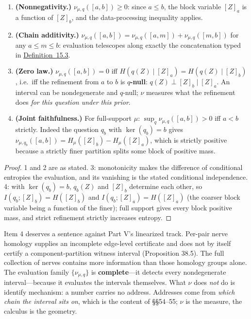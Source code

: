 \begin{thmplain}

\par\nopagebreak

\begin{enumerate}
\def\labelenumi{\arabic{enumi}.}
\tightlist
\item
  \textbf{(Nonnegativity.)} \(\nu_{\mu,q}([a,b]) \ge 0\): since \(a \le b\), the block variable \([Z]_a\) is a function of \([Z]_b\), and the data-processing inequality applies.
\item
  \textbf{(Chain additivity.)} \(\nu_{\mu,q}([a,b]) = \nu_{\mu,q}([a,m]) + \nu_{\mu,q}([m,b])\) for any \(a \le m \le b\): evaluation telescopes along exactly the concatenation typed in \hyperlink{stmt:15.3}{Definition~15.3}.
\item
  \textbf{(Zero law.)} \(\nu_{\mu,q}([a,b]) = 0\) iff \(H(q(Z) \mid [Z]_a) = H(q(Z) \mid [Z]_b)\), i.e.~iff the refinement from \(a\) to \(b\) is \textbf{\(q\)-null}: \(q(Z) \perp [Z]_b \mid [Z]_a\). An interval can be nondegenerate and \(q\)-null; \(\nu\) measures what the refinement does \emph{for this question under this prior}.
\item
  \textbf{(Joint faithfulness.)} For full-support \(\mu\): \(\sup_q \nu_{\mu,q}([a,b]) > 0\) iff \(a < b\) strictly. Indeed the question \(q_b\) with \(\ker(q_b) = b\) gives \(\nu_{\mu,q_b}([a,b]) = H_\mu([Z]_b) - H_\mu([Z]_a)\), which is strictly positive because a strictly finer partition splits some block of positive mass.
\end{enumerate}
\end{thmplain}

\begin{proof}

1 and 2 are as stated. 3: monotonicity makes the difference of conditional entropies the evaluation, and its vanishing is the stated conditional independence. 4: with \(\ker(q_b) = b\), \(q_b(Z)\) and \([Z]_b\) determine each other, so \(I(q_b; [Z]_b) = H([Z]_b)\) and \(I(q_b; [Z]_a) = H([Z]_a)\) (the coarser block variable being a function of the finer); full support gives every block positive mass, and strict refinement strictly increases entropy.
\end{proof}

Item 4 deserves a sentence against Part V's linearized track. Per-pair nerve homology supplies an incomplete edge-level certificate and does not by itself certify a component-partition witness interval (Proposition 38.5). The full collection of nerves contains more information than those homology groups alone. The evaluation family \(\{\nu_{\mu,q}\}\) is \textbf{complete}---\hspace{0pt}it detects every nondegenerate interval---\hspace{0pt}because it evaluates the intervals themselves. What \(\nu\) does \emph{not} do is identify mechanism: a number carries no address. Addresses come from \emph{which chain the interval sits on}, which is the content of §§54--55; \(\nu\) is the measure, the calculus is the geometry.

